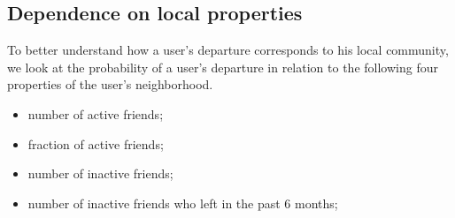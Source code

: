 \documentclass[phd,tocprelim]{cornell}
\begin{document}
\subsection{Dependence on local properties}

To better understand how a user's departure corresponds to his local community, we look at the probability of a user's departure in relation to the following four properties of the user's neighborhood.

\vspace{-4pt}
\begin{itemize}%
\item number of active friends;
\vspace{-3pt}
\item fraction of active friends;
\vspace{-3pt}
\item number of inactive friends;
\vspace{-3pt}
\item number of inactive friends who left in the past 6 months;
\end{itemize}
\vspace{-4pt}
\end{document}
